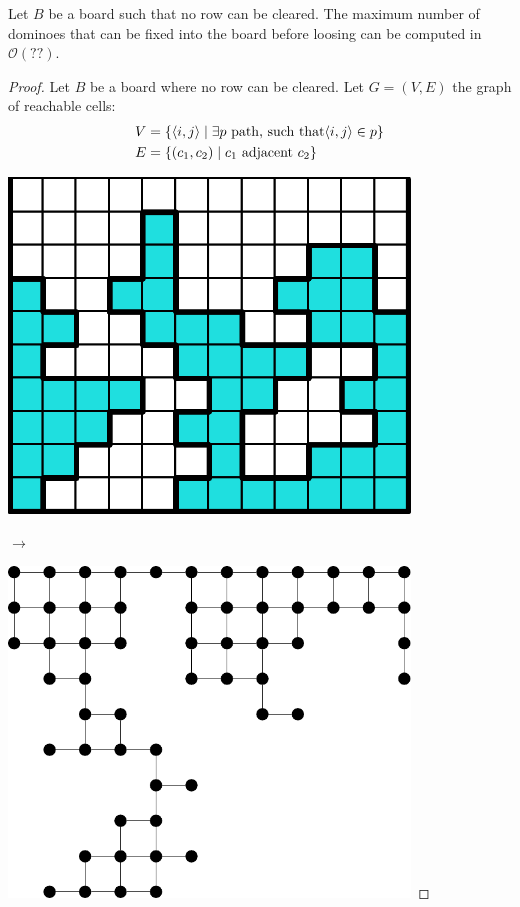 \begin{lemma} \label{dom:max-fill}
  Let $B$ be a board such that no row can be cleared. The maximum number of dominoes that can be fixed into the board before loosing can be computed in $\mathcal{O}(??)$.
\end{lemma}

\begin{proof}
  Let $B$ be a board where no row can be cleared. Let $G = (V,E)$ the graph of reachable cells:
  \begin{equation*}
    \begin{split}
      V & = \{ \cell \mid \exists p \text{ path,  such that} \cell \in p \} \\
      E & = \{ (c_1, c_2) \mid c_1 \text{ adjacent } c_2 \} 
    \end{split}
  \end{equation*}


    \begin{minipage}{0.4\textwidth}
        \centering
        \includegraphics[width=0.8\textwidth]{./pictures/dominoes/proof-max-fill/board.pdf}
    \end{minipage}
    \begin{minipage}{0.1\textwidth}
        \centering
        $\longrightarrow$
    \end{minipage}
    \begin{minipage}{0.4\textwidth}
        \centering
        \includegraphics[width=0.8\textwidth]{./pictures/graph.pdf}
    \end{minipage}


\end{proof}
